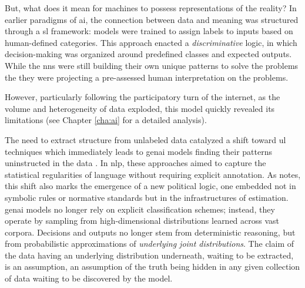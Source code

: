 


But, what does it mean for machines to possess representations of the reality? In earlier paradigms of \gls{ai}, the connection between data and meaning was structured through a \gls{sl} framework: models were trained to assign labels to inputs based on human-defined categories. This approach enacted a \textit{discriminative} logic, in which decision-making was organized around predefined classes and expected outputs. While the \glspl{nn} were still building their own unique patterns to solve the problems the they were projecting a pre-assessed human interpretation on the problems.

However, particularly following the participatory turn of the internet, as the volume and heterogeneity of data exploded, this model quickly revealed its limitations (see Chapter \ref{cha:ai} for a detailed analysis).

The need to extract structure from unlabeled data catalyzed a shift toward \gls{ul} techniques which immediately leads to \gls{genai} models finding their patterns uninstructed in the data . In \gls{nlp}, these approaches aimed to capture the statistical regularities of language without requiring explicit annotation. As \textcite[3]{amoore2024} notes, this shift also marks the emergence of a new political logic, one embedded not in symbolic rules or normative standards but in the infrastructures of estimation. \gls{genai} models no longer rely on explicit classification schemes; instead, they operate by sampling from high-dimensional distributions learned across vast corpora. Decisions and outputs no longer stem from deterministic reasoning, but from probabilistic approximations of \textit{underlying joint distributions}. The  claim of the data having an underlying distribution underneath, waiting to be extracted, is an assumption, an assumption of the truth being hidden in any given collection of data waiting to be discovered by the model.


